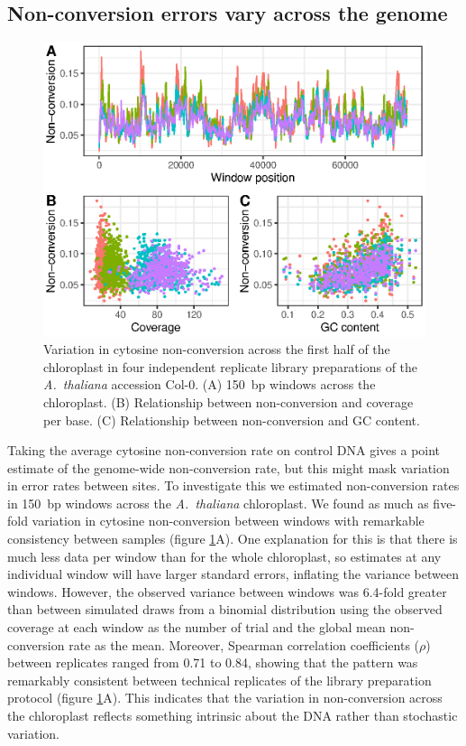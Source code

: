 \documentclass[twocolumn,twoside,lettersize]{article}
\begin{document}
\subsection{Non-conversion errors vary across the genome}

\begin{figure}
  \begin{center}
    \includegraphics{figure2.eps}
    \caption{
        Variation in cytosine non-conversion across the first half of the chloroplast in four independent replicate library preparations of the \emph{A.~thaliana} accession Col-0.
        (A) 150~bp windows across the chloroplast.
        (B) Relationship between non-conversion and coverage per base.
        (C) Relationship between non-conversion and GC content.
    }
    \label{fig:uncertainty}
  \end{center}
\end{figure}

Taking the average cytosine non-conversion rate on control DNA gives a point estimate of the genome-wide non-conversion rate, but this might mask variation in error rates between sites.
To investigate this we estimated non-conversion rates in 150~bp windows across the \emph{A.~thaliana} chloroplast.
We found as much as five-fold variation in cytosine non-conversion between windows with remarkable consistency between samples (figure \ref{fig:uncertainty}A).
One explanation for this is that there is much less data per window than for the whole chloroplast, so estimates at any individual window will have larger standard errors, inflating the variance between windows.
However, the observed variance between windows was 6.4-fold greater than between simulated draws from a binomial distribution using the observed coverage at each window as the number of trial and the global mean non-conversion rate as the mean.
Moreover, Spearman correlation coefficients ($\rho$) between replicates ranged from 0.71 to 0.84, showing that the pattern was remarkably consistent between technical replicates of the library preparation protocol (figure \ref{fig:uncertainty}A).
This indicates that the variation in non-conversion across the chloroplast reflects something intrinsic about the DNA rather than stochastic variation.
\end{document}
